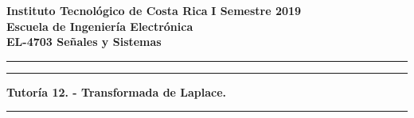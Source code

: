 
\onehalfspace
\noindent
\large\textbf{Instituto Tecnológico de Costa Rica} \hfill \textbf{I Semestre 2019} \\
\large\textbf{Escuela de Ingeniería Electrónica} \\
\large\textbf{EL-4703 Señales y Sistemas}

\noindent\rule[1mm]{\textwidth}{0.4pt}

\vspace{3mm}

\par\noindent\rule[-3mm]{\textwidth}{0.4pt}
\begin{center}
\Large\textbf{Tutoría 12. - Transformada de Laplace.}
\end{center}
\par\noindent\rule[6mm]{\textwidth}{0.4pt}

\vspace{2mm}

\setlength\parskip{3mm}
